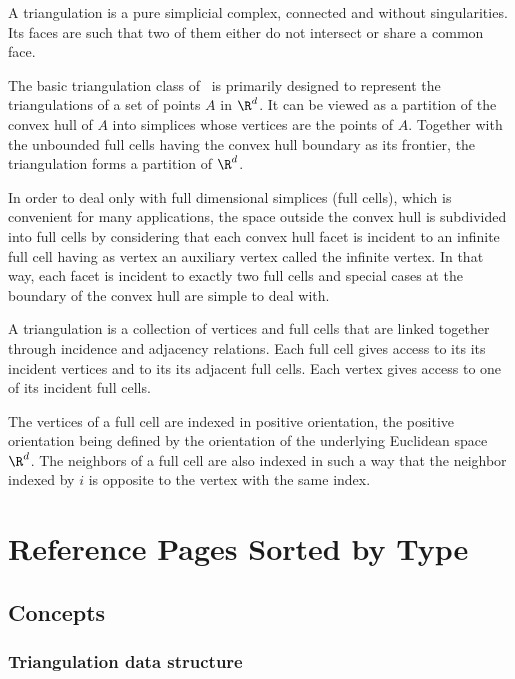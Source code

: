 


A triangulation is a pure simplicial complex, connected and without
singularities. Its faces are such that two of them either do not
intersect or share a common face.

The basic triangulation class of \cgal\ is primarily designed to
represent the triangulations of a set of points $A$ in $\R^d$.
 It can be
viewed as a partition of the convex hull of $A$ into simplices whose
vertices are the points of $A$. Together with the unbounded full cells having
the convex hull boundary as its frontier, the triangulation forms a
partition of $\R^d$.

In order to deal only with full dimensional simplices (full cells),
 which is convenient for many
applications, the space outside the convex hull is subdivided into
full cells by
considering that each convex hull facet is incident to an infinite
full cell having as vertex an auxiliary vertex called the infinite
vertex. In that way, each facet is incident to exactly two full cells and
special cases at the boundary of the convex hull are simple to deal
with. 

A triangulation is a collection of vertices and full cells that are linked
together through incidence and adjacency relations. Each full cell gives
access to its its incident vertices and to its its adjacent
full cells. Each vertex gives access to one of its incident full cells. 

The vertices of a full cell are indexed in positive
orientation, the positive orientation being defined by the orientation
of the underlying Euclidean space $\R^d$. The neighbors of a full cell are also
indexed  in such a way that the neighbor indexed by $i$
is opposite to the vertex with the same index.



\section{Reference Pages Sorted by Type}

\subsection{Concepts}

\subsubsection*{Triangulation data structure}

